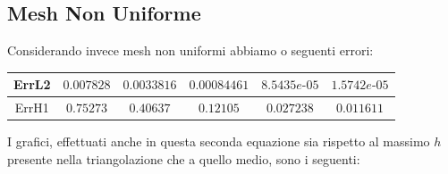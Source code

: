 \documentclass[12pt,a4paper]{report}
\theoremstyle{theorem}
\theoremstyle{theorem}
\theoremstyle{definition}
\begin{document}
\subsection{Mesh Non Uniforme}
Considerando invece mesh non uniformi abbiamo o seguenti errori:
\hfill \\
\begin{table}[!h]
\centering
\begin{tabular}{ | c | c | c | c | c | c | }
\hline
ErrL2	&	$0.007828$ &	 $0.0033816$	 & $0.00084461$	 & $8.5435e\text{-}05$ & $1.5742e\text{-}05$ \\ \hline 
ErrH1	&	$0.75273$ &	 $0.40637$	 & $0.12105$	 & $0.027238$ & $0.011611$ \\ \hline
\end{tabular}
\end{table}

I grafici, effettuati anche in questa seconda equazione sia rispetto al massimo $h$ presente nella triangolazione che a quello medio, sono i seguenti:
\end{document}
